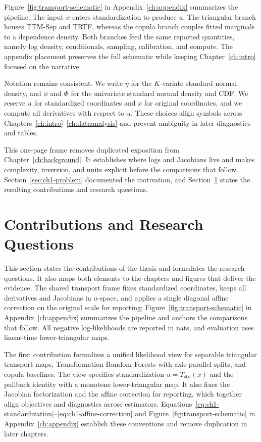 \documentclass[11pt,a4paper,twoside]{book}\usepackage[]{graphicx}\usepackage[]{xcolor}
\begin{document}
Figure~\ref{fig:transport-schematic} in Appendix~\ref{ch:appendix} summarizes the pipeline. The input $x$ enters standardization to produce $u$. The triangular branch houses TTM-Sep and TRTF, whereas the copula branch couples fitted marginals to a dependence density. Both branches feed the same reported quantities, namely log density, conditionals, sampling, calibration, and compute. The appendix placement preserves the full schematic while keeping Chapter~\ref{ch:intro} focused on the narrative.


Notation remains consistent. We write $\eta$ for the $K$-variate standard normal density, and $\phi$ and $\Phi$ for the univariate standard normal density and CDF. We reserve $u$ for standardized coordinates and $x$ for original coordinates, and we compute all derivatives with respect to $u$. These choices align symbols across Chapters~\ref{ch:intro}--\ref{ch:dataanalysis} and prevent ambiguity in later diagnostics and tables.

This one-page frame removes duplicated exposition from Chapter~\ref{ch:background}. It establishes where logs and Jacobians live and makes complexity, inversion, and units explicit before the comparisons that follow. Section~\ref{sec:ch1-problem} documented the motivation, and Section~\ref{sec:ch1-contributions} states the resulting contributions and research questions.

\section{Contributions and Research Questions}\label{sec:ch1-contributions}
This section states the contributions of the thesis and formulates the research questions. It also maps both elements to the chapters and figures that deliver the evidence. The shared transport frame fixes standardized coordinates, keeps all derivatives and Jacobians in $u$-space, and applies a single diagonal affine correction on the original scale for reporting; Figure~\ref{fig:transport-schematic} in Appendix~\ref{ch:appendix} summarizes the pipeline and anchors the comparisons that follow. All negative log-likelihoods are reported in nats, and evaluation uses linear-time lower-triangular maps.

The first contribution formalizes a unified likelihood view for separable triangular transport maps, Transformation Random Forests with axis-parallel splits, and copula baselines. The view specifies standardization $u = T_{\text{std}}(x)$ and the pullback identity with a monotone lower-triangular map. It also fixes the Jacobian factorization and the affine correction for reporting, which together align objectives and diagnostics across estimators. Equations~\eqref{eq:ch1-standardization}--\eqref{eq:ch1-affine-correction} and Figure~\ref{fig:transport-schematic} in Appendix~\ref{ch:appendix} establish these conventions and remove duplication in later chapters.
\end{document}
